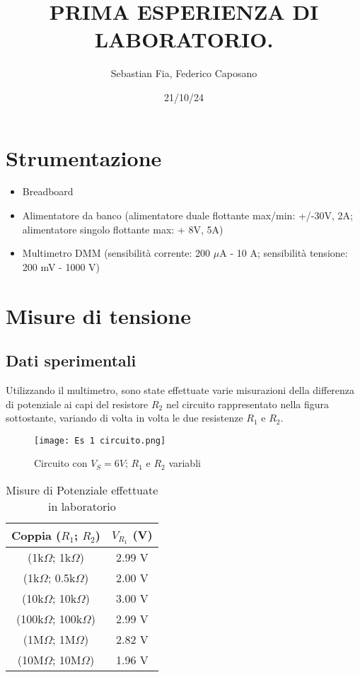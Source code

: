 \documentclass{article}
\title{PRIMA ESPERIENZA DI LABORATORIO.
}
\author{Sebastian Fia, Federico Caposano}
\date{21/10/24}
\begin{document}
	
	\maketitle   %
	
	\section{Strumentazione} \label{sec:Strumentazione}
	 	\begin{itemize} 
	 		\item Breadboard
	 		\item Alimentatore da banco (alimentatore duale flottante max/min: +/-30V, 2A; alimentatore singolo flottante max: + 8V, 5A)
	 		\item Multimetro DMM (sensibilità corrente: 200 $\mu$A - 10 A; sensibilità tensione: 200 mV - 1000 V)
	 	
	 	\end{itemize}
	
	\section{Misure di tensione} \label{sec:Tensione}
		\subsection{Dati sperimentali}
			Utilizzando il multimetro, sono state effettuate varie misurazioni 
			della differenza di potenziale ai capi del resistore $R_2$
			nel circuito rappresentato nella figura sottostante,
			variando di volta in volta le due resistenze $R_1$ e $R_2$. 

			\begin{figure}[h]
				\caption{Circuito con $V_S = 6V$; $R_1$ e $R_2$ variabli}
				\centering
				\texttt{[image: Es 1 circuito.png]}
			\end{figure}

			\begin{table}[h]
				\centering
				\captionsetup{skip=10pt} %
				\caption{Misure di Potenziale effettuate in laboratorio}
				\begin{tabular}{c|c}
					Coppia ($R_1$; $R_2$)	& $V_{R_1}$ (V) \\ \hline
					(1k$\Omega$; 1k$\Omega$)	& 2.99 V \\ \hline
					(1k$\Omega$; 0.5k$\Omega$) & 2.00 V \\ \hline
					(10k$\Omega$; 10k$\Omega$) & 3.00 V \\ \hline
					(100k$\Omega$; 100k$\Omega$) & 2.99 V \\ \hline
					(1M$\Omega$; 1M$\Omega$) & 2.82 V \\ \hline
					(10M$\Omega$; 10M$\Omega$) & 1.96 V \\
				\end{tabular}
			\end{table}
\end{document}
